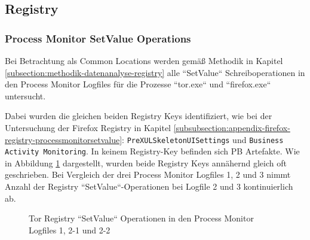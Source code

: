 \begin{appendices}
		\subsection{Registry}
		
		\subsubsection*{Process Monitor SetValue Operations}
		
		Bei Betrachtung als Common Locations werden gemäß Methodik in Kapitel \ref{subsection:methodik-datenanalyse-registry} alle ``SetValue`` Schreiboperationen in den Process Monitor Logfiles für die Prozesse ``tor.exe`` und ``firefox.exe`` untersucht. 
		
		Dabei wurden die gleichen beiden Registry Keys identifiziert, wie bei der Untersuchung der Firefox Registry in Kapitel \ref{subsubsection:appendix-firefox-registry-processmonitorsetvalue}: \texttt{PreXULSkeletonUISettings} und \texttt{Business Activity Monitoring}. In keinem Registry-Key befinden sich PB Artefakte.
		Wie in Abbildung \ref{chart:tor-registy-css-vs-bam} dargestellt, wurden beide Registry Keys annähernd gleich oft geschrieben. Bei Vergleich der drei Process Monitor Logfiles 1, 2 und 3 nimmt Anzahl der Registry ``SetValue``-Operationen bei Logfile 2 und 3 kontinuierlich ab.
		
		\begin{figure}[h!]
			\caption{Tor Registry ``SetValue`` Operationen in den Process Monitor Logfiles 1, 2-1 und 2-2}
			\label{chart:tor-registy-css-vs-bam}
		\end{figure}
		

\end{appendices}
